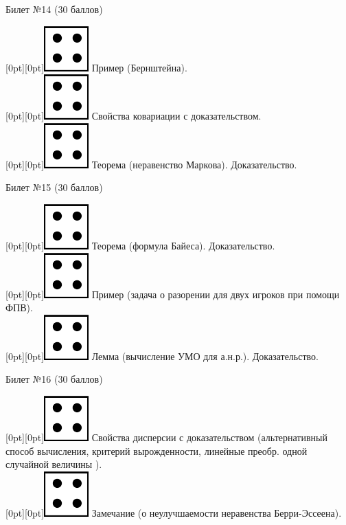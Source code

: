 \documentclass[preview]{standalone}
\begin{document}
\begin{center} {\Large Билет №14 (30 баллов)} \end{center}
\raisebox{-1pt}[0pt][0pt]{\includegraphics[width=0.02\linewidth]{4.png}}  Пример (Бернштейна). \\
\raisebox{-1pt}[0pt][0pt]{\includegraphics[width=0.02\linewidth]{4.png}} Свойства ковариации с доказательством. \\
\raisebox{-1pt}[0pt][0pt]{\includegraphics[width=0.02\linewidth]{4.png}} Теорема (неравенство Маркова). Доказательство. \\
\begin{center} {\Large Билет №15 (30 баллов)} \end{center}
\raisebox{-1pt}[0pt][0pt]{\includegraphics[width=0.02\linewidth]{4.png}} Теорема (формула Байеса). Доказательство. \\
\raisebox{-1pt}[0pt][0pt]{\includegraphics[width=0.02\linewidth]{4.png}} Пример (задача о разорении для двух игроков при помощи ФПВ). \\ 
\raisebox{-1pt}[0pt][0pt]{\includegraphics[width=0.02\linewidth]{4.png}} Лемма (вычисление УМО для а.н.р.). Доказательство. \\
\begin{center} {\Large Билет №16 (30 баллов)} \end{center}
\raisebox{-1pt}[0pt][0pt]{\includegraphics[width=0.02\linewidth]{4.png}} Свойства дисперсии с доказательством (альтернативный способ вычисления, критерий вырожденности, линейные преобр. одной случайной величины ). \\ 
\raisebox{-1pt}[0pt][0pt]{\includegraphics[width=0.02\linewidth]{4.png}} Замечание (о неулучшаемости неравенства Берри-Эссеена). \\
\end{document}
